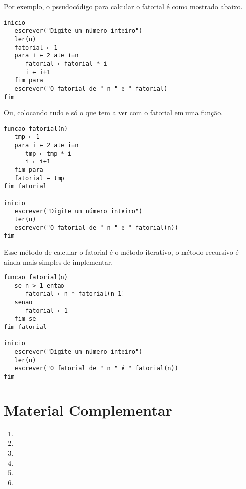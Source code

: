 Por exemplo, o pseudocódigo para calcular o fatorial é como mostrado abaixo.

\begin{lstlisting}[style=pseudo]
inicio
   escrever("Digite um número inteiro")
   ler(n)
   fatorial ← 1
   para i ← 2 ate i=n
      fatorial ← fatorial * i
      i ← i+1
   fim para
   escrever("O fatorial de " n " é " fatorial)
fim
\end{lstlisting}

\noindent
Ou, colocando tudo e só o que tem a ver com o fatorial em uma função.

\begin{lstlisting}[style=pseudo]
funcao fatorial(n)
   tmp ← 1
   para i ← 2 ate i=n
      tmp ← tmp * i
      i ← i+1
   fim para
   fatorial ← tmp
fim fatorial

inicio
   escrever("Digite um número inteiro")
   ler(n)
   escrever("O fatorial de " n " é " fatorial(n))
fim
\end{lstlisting}

\noindent
Esse método de calcular o fatorial é o método iterativo, o método recursivo
é ainda mais simples de implementar.

\begin{lstlisting}[style=pseudo]
funcao fatorial(n)
   se n > 1 entao
      fatorial ← n * fatorial(n-1)
   senao
      fatorial ← 1
   fim se
fim fatorial

inicio
   escrever("Digite um número inteiro")
   ler(n)
   escrever("O fatorial de " n " é " fatorial(n))
fim
\end{lstlisting}


\section{Material Complementar}

\begin{enumerate}[nosep]
   \item {}
   \item {}
   \item {}
   \item {}
   \item {}
   \item {}
\end{enumerate}

